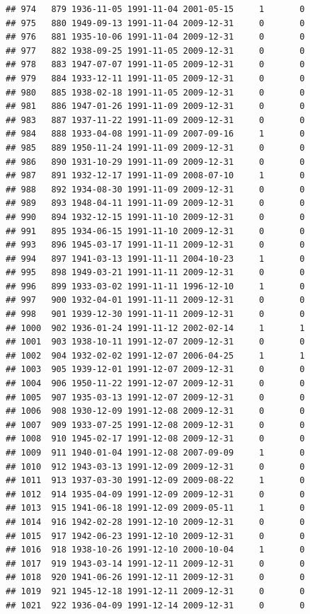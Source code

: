 \documentclass[
]{book}
\theoremstyle{definition}
\theoremstyle{definition}
\theoremstyle{definition}
\theoremstyle{definition}
\theoremstyle{remark}
\begin{document}
\begin{verbatim}
## 974   879 1936-11-05 1991-11-04 2001-05-15     1       0
## 975   880 1949-09-13 1991-11-04 2009-12-31     0       0
## 976   881 1935-10-06 1991-11-04 2009-12-31     0       0
## 977   882 1938-09-25 1991-11-05 2009-12-31     0       0
## 978   883 1947-07-07 1991-11-05 2009-12-31     0       0
## 979   884 1933-12-11 1991-11-05 2009-12-31     0       0
## 980   885 1938-02-18 1991-11-05 2009-12-31     0       0
## 981   886 1947-01-26 1991-11-09 2009-12-31     0       0
## 983   887 1937-11-22 1991-11-09 2009-12-31     0       0
## 984   888 1933-04-08 1991-11-09 2007-09-16     1       0
## 985   889 1950-11-24 1991-11-09 2009-12-31     0       0
## 986   890 1931-10-29 1991-11-09 2009-12-31     0       0
## 987   891 1932-12-17 1991-11-09 2008-07-10     1       0
## 988   892 1934-08-30 1991-11-09 2009-12-31     0       0
## 989   893 1948-04-11 1991-11-09 2009-12-31     0       0
## 990   894 1932-12-15 1991-11-10 2009-12-31     0       0
## 991   895 1934-06-15 1991-11-10 2009-12-31     0       0
## 993   896 1945-03-17 1991-11-11 2009-12-31     0       0
## 994   897 1941-03-13 1991-11-11 2004-10-23     1       0
## 995   898 1949-03-21 1991-11-11 2009-12-31     0       0
## 996   899 1933-03-02 1991-11-11 1996-12-10     1       0
## 997   900 1932-04-01 1991-11-11 2009-12-31     0       0
## 998   901 1939-12-30 1991-11-11 2009-12-31     0       0
## 1000  902 1936-01-24 1991-11-12 2002-02-14     1       1
## 1001  903 1938-10-11 1991-12-07 2009-12-31     0       0
## 1002  904 1932-02-02 1991-12-07 2006-04-25     1       1
## 1003  905 1939-12-01 1991-12-07 2009-12-31     0       0
## 1004  906 1950-11-22 1991-12-07 2009-12-31     0       0
## 1005  907 1935-03-13 1991-12-07 2009-12-31     0       0
## 1006  908 1930-12-09 1991-12-08 2009-12-31     0       0
## 1007  909 1933-07-25 1991-12-08 2009-12-31     0       0
## 1008  910 1945-02-17 1991-12-08 2009-12-31     0       0
## 1009  911 1940-01-04 1991-12-08 2007-09-09     1       0
## 1010  912 1943-03-13 1991-12-09 2009-12-31     0       0
## 1011  913 1937-03-30 1991-12-09 2009-08-22     1       0
## 1012  914 1935-04-09 1991-12-09 2009-12-31     0       0
## 1013  915 1941-06-18 1991-12-09 2009-05-11     1       0
## 1014  916 1942-02-28 1991-12-10 2009-12-31     0       0
## 1015  917 1942-06-23 1991-12-10 2009-12-31     0       0
## 1016  918 1938-10-26 1991-12-10 2000-10-04     1       0
## 1017  919 1943-03-14 1991-12-11 2009-12-31     0       0
## 1018  920 1941-06-26 1991-12-11 2009-12-31     0       0
## 1019  921 1945-12-18 1991-12-11 2009-12-31     0       0
## 1021  922 1936-04-09 1991-12-14 2009-12-31     0       0

\end{verbatim}
\end{document}
